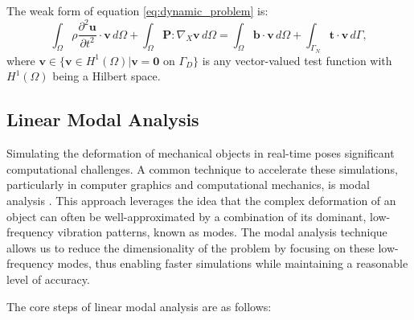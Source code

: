 The weak form of equation \eqref{eq:dynamic_problem} is:
\begin{equation}
    \int_{\Omega} \rho \frac{\partial^2 \bm{u}}{\partial t^2} \cdot \bm{v} \, d\Omega + \int_{\Omega} \bm{P} : \nabla_X \bm{v} \, d\Omega = \int_{\Omega} \bm{b} \cdot \bm{v} \, d\Omega + \int_{\Gamma_N} \bm{t} \cdot \bm{v} \, d\Gamma,
\label{eq:weak_form}
\end{equation}
where $\bm{v} \in \{\bm{v} \in H^1(\Omega) | \bm{v} = \bm{0} \text{ on } \Gamma_D\}$ is any vector-valued test function with $H^1(\Omega)$ being a Hilbert space. 

\subsection{Linear Modal Analysis}
\label{sec:linear_modes}

Simulating the deformation of mechanical objects in real-time poses significant computational challenges. A common technique to accelerate these simulations, particularly in computer graphics and computational mechanics, is modal analysis \cite{Pentland_Williams_1989}. This approach leverages the idea that the complex deformation of an object can often be well-approximated by a combination of its dominant, low-frequency vibration patterns, known as modes. The modal analysis technique allows us to reduce the dimensionality of the problem by focusing on these low-frequency modes, thus enabling faster simulations while maintaining a reasonable level of accuracy.


The core steps of linear modal analysis are as follows:

